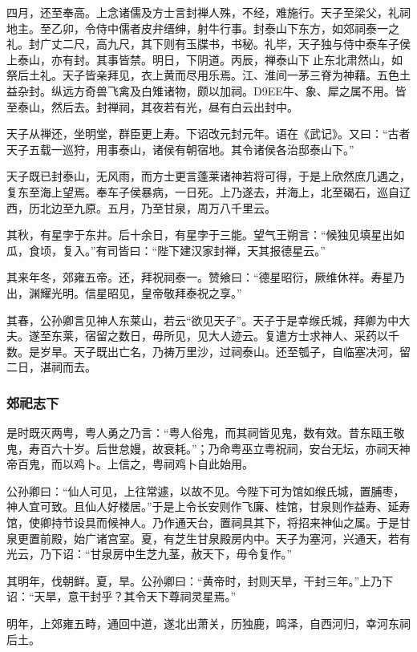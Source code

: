\documentclass[]{article}
\begin{document}
四月，还至奉高。上念诸儒及方士言封禅人殊，不经，难施行。天子至梁父，礼祠地主。至乙卯，令侍中儒者皮弁缙绅，射牛行事。封泰山下东方，如郊祠泰一之礼。封广丈二尺，高九尺，其下则有玉牒书，书秘。礼毕，天子独与侍中泰车子侯上泰山，亦有封。其事皆禁。明日，下阴道。丙辰，禅泰山下止东北肃然山，如祭后土礼。天子皆亲拜见，衣上黄而尽用乐焉。江、淮间一茅三脊为神藉。五色土益杂封。纵远方奇兽飞禽及白雉诸物，颇以加祠。D9EE牛、象、犀之属不用。皆至泰山，然后去。封禅祠，其夜若有光，昼有白云出封中。

天子从禅还，坐明堂，群臣更上寿。下诏改元封元年。语在《武记》。又曰：``古者天子五载一巡狩，用事泰山，诸侯有朝宿地。其令诸侯各治邸泰山下。''

天子既已封泰山，无风雨，而方士更言蓬莱诸神若将可得，于是上欣然庶几遇之，复东至海上望焉。奉车子侯暴病，一日死。上乃遂去，并海上，北至碣石，巡自辽西，历北边至九原。五月，乃至甘泉，周万八千里云。

其秋，有星孛于东井。后十余日，有星孛于三能。望气王朔言：``候独见填星出如瓜，食顷，复入。''有司皆曰：``陛下建汉家封禅，天其报德星云。''

其来年冬，郊雍五帝。还，拜祝祠泰一。赞飨曰：``德星昭衍，厥维休祥。寿星乃出，渊耀光明。信星昭见，皇帝敬拜泰祝之享。''

其春，公孙卿言见神人东莱山，若云``欲见天子''。天子于是幸缑氏城，拜卿为中大夫。遂至东莱，宿留之数日，毋所见，见大人迹云。复遣方士求神人、采药以千数。是岁旱。天子既出亡名，乃祷万里沙，过祠泰山。还至瓠子，自临塞决河，留二日，湛祠而去。

\hypertarget{header-n1781}{%
\subsubsection{郊祀志下}\label{header-n1781}}

是时既灭两粤，粤人勇之乃言：``粤人俗鬼，而其祠皆见鬼，数有效。昔东瓯王敬鬼，寿百六十岁。后世怠嫚，故衰耗。''；乃命粤巫立粤祝祠，安台无坛，亦祠天神帝百鬼，而以鸡卜。上信之，粤祠鸡卜自此始用。

公孙卿曰：``仙人可见，上往常遽，以故不见。今陛下可为馆如缑氏城，置脯枣，神人宜可致。且仙人好楼居。''于是上令长安则作飞廉、桂馆，甘泉则作益寿、延寿馆，使卿持节设具而候神人。乃作通天台，置祠具其下，将招来神仙之属。于是甘泉更置前殿，始广诸宫室。夏，有芝生甘泉殿房内中。天子为塞河，兴通天，若有光云，乃下诏：``甘泉房中生芝九茎，赦天下，毋令复作。''

其明年，伐朝鲜。夏，旱。公孙卿曰：``黄帝时，封则天旱，干封三年。''上乃下诏：``天旱，意干封乎？其令天下尊祠灵星焉。''

明年，上郊雍五畤，通回中道，遂北出萧关，历独鹿，鸣泽，自西河归，幸河东祠后土。
\end{document}
